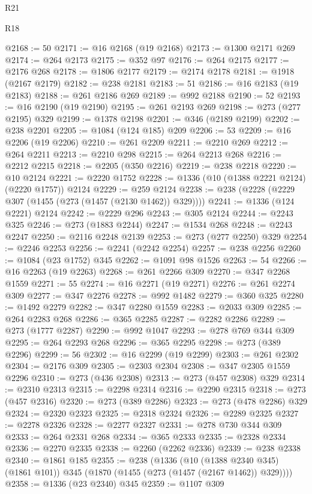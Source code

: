 \begin{lexlean}{R21}
\begin{lexlean}{R18}
\begin{coremodule}
{{{{{{{{{{{{{{{{{{{{{{{{{{{{{{{{{{{{{{{{{{{{{{{{{{{{{{{{{{{{{{{{{{{{{{{{{{{{{{{{{{{{{{{{{{{{{{{{{{{{{{{{{{{{{{{{{{{{{{{{{{{{{{{{{{{{{{{{{{{{{{{@2168 := 50
@2171 := @16 @2168 (@19 @2168)
@2173 := @1300 @2171 @269
@2174 := @264 @2173
@2175 := @352 @97
@2176 := @264 @2175
@2177 := @2176 @268
@2178 := @1806 @2177
@2179 := @2174 @2178
@2181 := @1918 (@2167 @2179)
@2182 := @238 @2181
@2183 := 51
@2186 := @16 @2183 (@19 @2183)
@2188 := @261 @2186 @269
@2189 := @992 @2188
@2190 := 52
@2193 := @16 @2190 (@19 @2190)
@2195 := @261 @2193 @269
@2198 := @273 (@277 @2195) @329
@2199 := @1378 @2198
@2201 := @346 (@2189 @2199)
@2202 := @238 @2201
@2205 := @1084 (@124 @185) @209
@2206 := 53
@2209 := @16 @2206 (@19 @2206)
@2210 := @261 @2209
@2211 := @2210 @269
@2212 := @264 @2211
@2213 := @2210 @298
@2215 := @264 @2213 @268
@2216 := @2212 @2215
@2218 := @2205 (@350 @2216)
@2219 := @238 @2218
@2220 := @10 @2124
@2221 := @2220 @1752
@2228 := @1336 (@10 (@1388 @2221 @2124) (@2220 @1757)) @2124
@2229 := @259 @2124
@2238 := @238 (@2228 (@2229 @307 (@1455 (@273 (@1457 (@2130 @1462)) @329))))
@2241 := @1336 (@124 @2221) @2124
@2242 := @2229 @296
@2243 := @305 @2124
@2244 := @2243 @325
@2246 := @273 (@1883 @2244)
@2247 := @1534 @268
@2248 := @2243 @2247
@2250 := @2116 @2248 @2139
@2253 := @273 (@277 @2250) @329
@2254 := @2246 @2253
@2256 := @2241 (@2242 @2254)
@2257 := @238 @2256
@2260 := @1084 (@23 @1752) @345
@2262 := @1091 @98 @1526
@2263 := 54
@2266 := @16 @2263 (@19 @2263)
@2268 := @261 @2266 @309
@2270 := @347 @2268 @1559
@2271 := 55
@2274 := @16 @2271 (@19 @2271)
@2276 := @261 @2274 @309
@2277 := @347 @2276
@2278 := @992 @1482
@2279 := @360 @325
@2280 := @1492 @2279
@2282 := @347 @2280 @1559
@2283 := @2033 @309
@2285 := @264 @2283 @268
@2286 := @365 @2285
@2287 := @2282 @2286
@2289 := @273 (@1777 @2287)
@2290 := @992 @1047
@2293 := @278 @769 @344 @309
@2295 := @264 @2293 @268
@2296 := @365 @2295
@2298 := @273 (@389 @2296)
@2299 := 56
@2302 := @16 @2299 (@19 @2299)
@2303 := @261 @2302
@2304 := @2176 @309
@2305 := @2303 @2304
@2308 := @347 @2305 @1559 @2296
@2310 := @273 (@436 @2308)
@2313 := @273 (@457 @2308) @329
@2314 := @2310 @2313
@2315 := @2298 @2314
@2316 := @2290 @2315
@2318 := @273 (@457 @2316)
@2320 := @273 (@389 @2286)
@2323 := @273 (@478 @2286) @329
@2324 := @2320 @2323
@2325 := @2318 @2324
@2326 := @2289 @2325
@2327 := @2278 @2326
@2328 := @2277 @2327
@2331 := @278 @730 @344 @309
@2333 := @264 @2331 @268
@2334 := @365 @2333
@2335 := @2328 @2334
@2336 := @2270 @2335
@2338 := @2260 (@2262 @2336)
@2339 := @238 @2338
@2340 := @1861 @185
@2355 := @238
    (@1336
      (@10 (@1388 @2340 @345) (@1861 @101))
      @345
      (@1870 (@1455 (@273 (@1457 (@2167 @1462)) @329))))
@2358 := @1336 (@23 @2340) @345
@2359 := @1107 @309
}}}}}}}}}}}}}}}}}}}}}}}}}}}}}}}}}}}}}}}}}}}}}}}}}}}}}}}}}}}}}}}}}}}}}}}}}}}}}}}}}}}}}}}}}}}}}}}}}}}}}}}}}}}}}}}}}}}}}}}}}}}}}}}}}}}}}}}}}}}}}}}
\end{coremodule}
\end{lexlean}
\end{lexlean}
